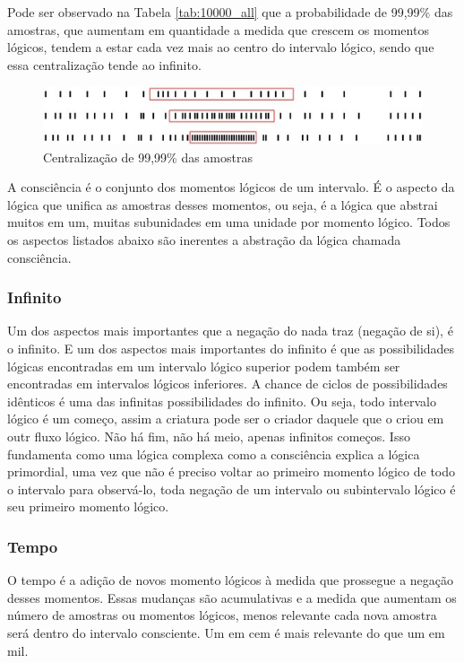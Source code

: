 Pode ser observado na Tabela \ref{tab:10000_all} que a probabilidade de 99,99\% das amostras, que aumentam em quantidade a medida que crescem os momentos lógicos, tendem a estar cada vez mais ao centro do intervalo lógico, sendo que essa centralização tende ao infinito.

\begin{figure}[H]
\caption{Centralização de 99,99\% das amostras}
\label{fig:centering_of_99_range}
\centering
\includegraphics[scale=1]{sections/images/centering_of_99_range.jpg}
\end{figure}

A consciência é o conjunto dos momentos lógicos de um intervalo. É o aspecto da lógica que unifica as amostras desses momentos, ou seja, é a lógica que abstrai muitos em um, muitas subunidades em uma unidade por momento lógico. Todos os aspectos listados abaixo são inerentes a abstração da lógica chamada consciência.

\subsubsection{Infinito}
Um dos aspectos mais importantes que a negação do nada traz (negação de si), é o infinito. E um dos aspectos mais importantes do infinito é que as possibilidades lógicas encontradas em um intervalo lógico superior podem também ser encontradas em intervalos lógicos inferiores. A chance de ciclos de possibilidades idênticos é uma das infinitas possibilidades do infinito. Ou seja, todo intervalo lógico é um começo, assim a criatura pode ser o criador daquele que o criou em outr fluxo lógico. Não há fim, não há meio, apenas infinitos começos. Isso fundamenta como uma lógica complexa como a consciência explica a lógica primordial, uma vez que não é preciso voltar ao primeiro momento lógico de todo o intervalo para observá-lo, toda negação de um intervalo  ou subintervalo lógico é seu primeiro momento lógico.

\subsubsection{Tempo}
O tempo é a adição de novos momento lógicos à medida que prossegue a negação desses momentos.  Essas mudanças são acumulativas e a medida que aumentam os número de amostras ou momentos lógicos, menos relevante cada nova amostra será dentro do intervalo consciente. Um em cem é mais relevante do que um em mil. 

